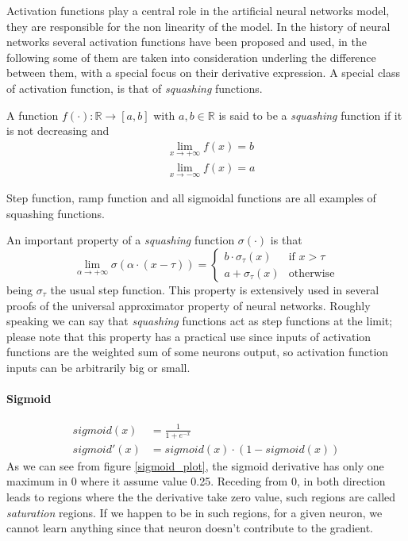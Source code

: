 Activation functions play a central role in the artificial neural networks model, they are responsible for the non linearity of the model.
In the history of neural networks several activation functions have been proposed and used, in the following some of them are taken into consideration
underling the difference between them, with a special focus on their derivative expression.
A special class of activation function, is that of \textit{squashing} functions.

\begin{defn}
A function $f(\cdot):\mathbb{R}\rightarrow[a,b]$ with $a,b \in \mathbb{R}$ is said to be a \textit{squashing} function if it is not decreasing and 
\begin{align}
&\lim_{x \to +\infty} f(x) = b \\
&\lim_{x \to -\infty} f(x) = a 
\end{align}
\end{defn}
Step function, ramp function and all sigmoidal functions are all examples of squashing functions.

\begin{remark}
An important property of a \textit{squashing} function $\sigma(\cdot)$ is that
\begin{equation}
 \lim_{\alpha \to +\infty} \sigma(\alpha\cdot (x-\tau))= 
 \begin{cases}
    b \cdot \sigma_{\tau}(x) & \text{if $x> \tau $}\\
    a + \sigma_{\tau}(x) & \text{otherwise}
  \end{cases}
\end{equation}
being $\sigma_{\tau}$ the usual step function.
This property is extensively used in several proofs of the universal approximator property of neural networks. Roughly speaking we can say that \textit{squashing} functions act as step functions
at the limit; please note that this property has a practical use since inputs of activation functions are the weighted sum of some neurons output,
so activation function inputs can be arbitrarily big or small.
\end{remark}


\paragraph{Sigmoid}

\begin{align}
sigmoid(x)&= \frac{1}{1+e^{-x}}  \\ 
sigmoid'(x)&= sigmoid(x) \cdot (1-sigmoid(x))
\end{align}
As we can see from figure \ref{sigmoid_plot}, the sigmoid derivative has only one maximum in 0 where it assume value 0.25. Receding from 0, in both direction leads to regions where
the the derivative take zero value, such regions are called \textit{saturation} regions. If we happen to be in such regions, for a given neuron, we cannot learn anything since that neuron doesn't contribute
to the gradient.

